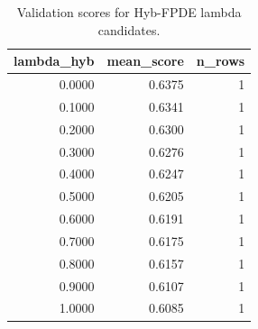 \begin{table}[t]
\caption{Validation scores for Hyb-FPDE lambda candidates.}
\label{tab:lambda_distribution_computed}
\centering
\begin{tabular}{rrr}
\toprule
lambda\_hyb & mean\_score & n\_rows \\
\midrule
0.0000 & 0.6375 & 1 \\
0.1000 & 0.6341 & 1 \\
0.2000 & 0.6300 & 1 \\
0.3000 & 0.6276 & 1 \\
0.4000 & 0.6247 & 1 \\
0.5000 & 0.6205 & 1 \\
0.6000 & 0.6191 & 1 \\
0.7000 & 0.6175 & 1 \\
0.8000 & 0.6157 & 1 \\
0.9000 & 0.6107 & 1 \\
1.0000 & 0.6085 & 1 \\
\bottomrule
\end{tabular}

\end{table}
